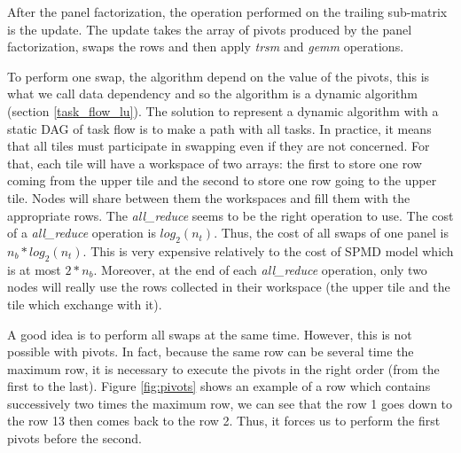 After the panel factorization, the operation performed on the trailing sub-matrix is the update. The update takes the array of pivots produced by the panel factorization, swaps the rows and then apply \emph{trsm} and \emph{gemm} operations.

To perform one swap, the algorithm depend on the value of the pivots, this is what we call data dependency and so the algorithm is a dynamic algorithm (section \ref{task_flow_lu}). The solution to represent a dynamic algorithm with a static DAG of task flow is to make a path with all tasks. In practice, it means that all tiles must participate in swapping even if they are not concerned.
For that, each tile will have a workspace of two arrays: the first to store one row coming from the upper tile and the second to store one row going to the upper tile. Nodes will share between them the workspaces and fill them with the appropriate rows.
The \emph{all\_reduce} seems to be the right operation to use. The cost of a \emph{all\_reduce} operation is $log_2(n_t)$. Thus, the cost of all swaps of one panel is $n_b*log_2(n_t)$. This is very expensive relatively to the cost of SPMD model which is at most $2*n_b$.
Moreover, at the end of each \emph{all\_reduce} operation, only two nodes will really use the rows collected in their workspace (the upper tile and the tile which exchange with it).

A good idea is to perform all swaps at the same time. However, this is not possible with pivots. In fact, because the same row can be several time the maximum row, it is necessary to execute the pivots in the right order (from the first to the last). Figure \ref{fig:pivots} shows an example of a row which contains successively two times the maximum row, we can see that the row 1 goes down to the row 13 then comes back to the row 2. Thus, it forces us to perform the first pivots before the second.

